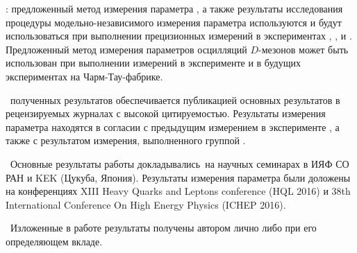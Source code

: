 \influence: предложенный метод измерения параметра \pphi, а также результаты исследования процедуры модельно-независимого измерения параметра \gphi используются и будут использоваться при выполнении прецизионных измерений в экспериментах \babar, \belle, \belleii и \lhcb.  Предложенный метод измерения параметров осцилляций $D$-мезонов может быть использован при выполнении измерений в эксперименте \besiii и в будущих экспериментах на Чарм-Тау-фабрике.

\reliability\ полученных результатов обеспечивается публикацией основных результатов в рецензируемых журналах с высокой цитируемостью. Результаты измерения параметра \pphi находятся в согласии с предыдущим измерением в эксперименте \belle, а также с результатом измерения, выполненного группой \babar.

\probation\ Основные результаты работы докладывались~на научных семинарах в ИЯФ СО РАН и KEK (Цукуба, Япония).  Результаты измерения параметра \pphi были доложены на конференциях XIII Heavy Quarks and Leptons conference (HQL 2016) и 38th International Conference On High Energy Physics (ICHEP 2016).

\contribution\ Изложенные в работе результаты получены автором лично либо при его определяющем вкладе.


